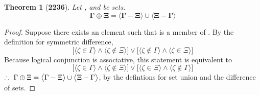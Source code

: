 \documentclass[preview]{standalone}
\newtheorem*{theorem*}{Theorem}
\begin{document}
\begin{theorem*}[\textbf{2236}] \color{black}
    Let \bm{$\Gamma$}, and \bm{$\Xi$} be sets. 
    \begin{equation*}
        \bm{
            \Gamma \oplus \Xi 
                = 
            \Big \langle \Gamma - \Xi \Big \rangle
                \cup 
            \Big \langle \Xi - \Gamma \Big \rangle
        }
    \end{equation*}
\end{theorem*}
\begin{proof} \color{black}
    Suppose there exists an element \bm{$\zeta$} such that \bm{$\zeta$} is a member of \bm{$\Gamma \oplus \Xi$}. 
    By the definition for symmetric difference,
    \begin{equation*}
        \bigg[
            \Big \langle \zeta \in \Gamma \Big \rangle 
                \land 
            \Big \langle \zeta \notin \Xi \Big \rangle
        \bigg] 
            \lor 
        \bigg[
            \Big \langle \zeta \notin \Gamma \Big \rangle
                \land 
            \Big \langle \zeta \in \Xi \Big \rangle
        \bigg]   
    \end{equation*}
    Because logical conjunction is associative, this statement is equivalent to 
    \begin{equation*}
        \bigg[
            \Big \langle \zeta \in \Gamma \Big \rangle 
                \land 
            \Big \langle \zeta \notin \Xi \Big \rangle
        \bigg] 
            \lor 
        \bigg[
            \Big \langle \zeta \in \Xi \Big \rangle
                \land 
            \Big \langle \zeta \notin \Gamma \Big \rangle
        \bigg]   
    \end{equation*}
    $\therefore \text{\space} \relax{
        \Gamma \oplus \Xi 
        = 
    \big \langle \Gamma - \Xi \big \rangle
        \cup 
    \big \langle \Xi - \Gamma \big \rangle
    }$, by the defintions for set union and the difference of sets.
\color{lightgray} \end{proof}
\end{document}
